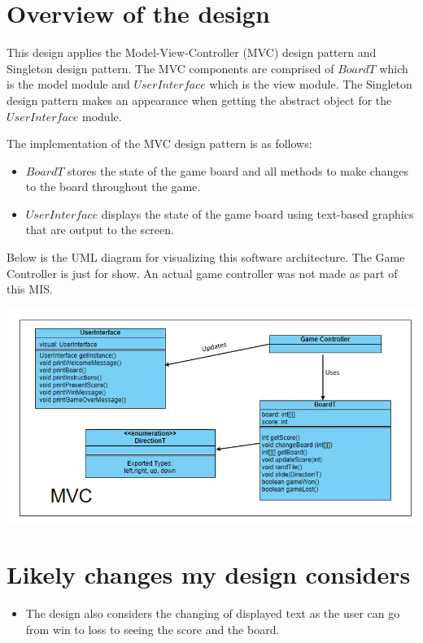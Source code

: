 \documentclass[12pt]{article}
\begin{document}
\section* {Overview of the design}

This design applies the Model-View-Controller (MVC) design pattern and Singleton design pattern. The MVC components are comprised of $BoardT$ which is the model module and $UserInterface$ which is the view module. The Singleton design pattern makes an appearance when getting the abstract object for the $UserInterface$ module. \newline

The implementation of the MVC design pattern is as follows:
\begin{itemize}
    \item $BoardT$ stores the state of the game board and all methods to make changes to the board throughout the game. 
    \item $UserInterface$ displays the state of the game board using text-based graphics that are output to the screen. 
\end{itemize}

Below is the UML diagram for visualizing this software architecture. The Game Controller is just for show. An actual game controller was not made as part of this MIS. 

\begin{center}
	\includegraphics[scale = 0.5]{mvcUML.jpeg}
\end{center}


\section* {Likely changes my design considers}
\begin{itemize}
    \item The design also considers the changing of displayed text as the user can go from win to loss to seeing the score and the board.
\end{itemize}
\newpage
\end{document}
